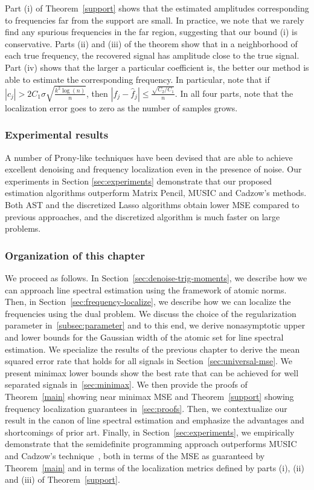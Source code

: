Part (i) of Theorem~\ref{support} shows that the estimated amplitudes
corresponding to frequencies far from the support are small. In practice, we
note that we rarely find any spurious frequencies in the far region, suggesting
that our bound (i) is conservative. Parts (ii) and (iii) of the theorem show
that in a neighborhood of each true frequency, the recovered signal has
amplitude close to the true signal. Part (iv) shows that the larger a particular
coefficient is, the better our method is able to estimate the corresponding
frequency. In particular, note that if $|c_j| > 2 C_1 \sigma \sqrt{\frac{ k^2
\log(n)}{n}}$, then $\left| f_j - \hat{f}_j \right| \leq \frac{\sqrt{C_2/C_1}
}{n}$. In all four parts, note that the localization error goes to zero as the
number of samples grows.

\subsubsection{Experimental results} 

A number of Prony-like techniques have been devised that are able to achieve
excellent denoising and frequency localization even in the presence of noise.
Our experiments in Section \ref{sec:experiments} demonstrate that our proposed
estimation algorithms outperform Matrix Pencil, MUSIC and Cadzow's methods. Both
AST and the discretized Lasso algorithms obtain lower MSE compared to previous
approaches, and the discretized algorithm is much faster on large problems.

\subsubsection{Organization of this chapter}

We proceed as follows. In Section~\ref{sec:denoise-trig-moments}, we describe
how we can approach line spectral estimation using the framework of atomic
norms. Then, in Section~\ref{sec:frequency-localize}, we describe how we can
localize the frequencies using the dual problem. We discuss the choice of the
regularization parameter in~\ref{subsec:parameter} and to this end, we derive
nonasymptotic upper and lower bounds for the Gaussian width of the atomic set
for line spectral estimation. We specialize the results of the previous chapter
to derive the mean squared error rate that holds for all signals in
Section~\ref{sec:universal-mse}. We present minimax lower bounds show the best
rate that can be achieved for well separated signals in~\ref{sec:minimax}. We
then provide the proofs of Theorem~\ref{main} showing near minimax MSE and
Theorem~\ref{support} showing frequency localization guarantees
in~\ref{sec:proofs}. Then, we contextualize our result in the canon of line
spectral estimation and emphasize the advantages and shortcomings of prior art.
Finally, in Section~\ref{sec:experiments}, we empirically demonstrate that the
semidefinite programming approach outperforms MUSIC~\cite{music} and Cadzow's
technique~\cite{cadzow05}, both in terms of the MSE as guaranteed by
Theorem~\ref{main} and in terms of the localization metrics defined by parts
(i), (ii) and (iii) of Theorem~\ref{support}.

